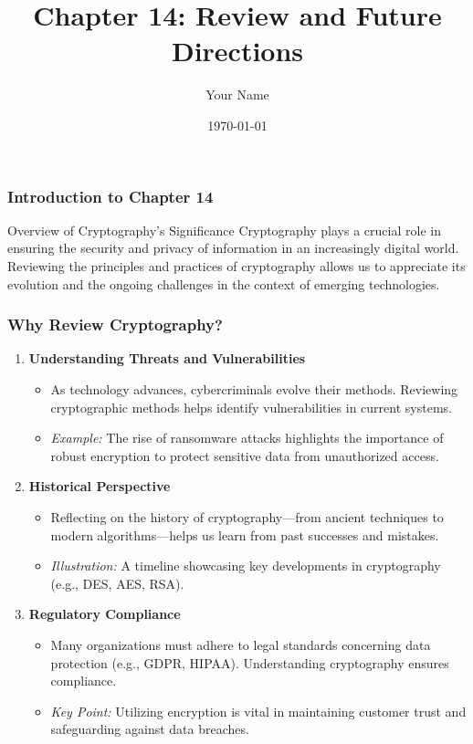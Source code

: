 \documentclass{beamer}
\title{Chapter 14: Review and Future Directions}
\author{Your Name}
\institute{Your Institution}
\date{\today}
\begin{document}
\frame{\titlepage}

\begin{frame}[fragile]
    \frametitle{Introduction to Chapter 14}
    \begin{block}{Overview of Cryptography's Significance}
        Cryptography plays a crucial role in ensuring the security and privacy of information in an increasingly digital world. 
        Reviewing the principles and practices of cryptography allows us to appreciate its evolution and the ongoing challenges in the context of emerging technologies.
    \end{block}
\end{frame}

\begin{frame}[fragile]
    \frametitle{Why Review Cryptography?}
    \begin{enumerate}
        \item \textbf{Understanding Threats and Vulnerabilities}
            \begin{itemize}
                \item As technology advances, cybercriminals evolve their methods. Reviewing cryptographic methods helps identify vulnerabilities in current systems.
                \item \textit{Example:} The rise of ransomware attacks highlights the importance of robust encryption to protect sensitive data from unauthorized access.
            \end{itemize}
        \item \textbf{Historical Perspective}
            \begin{itemize}
                \item Reflecting on the history of cryptography—from ancient techniques to modern algorithms—helps us learn from past successes and mistakes.
                \item \textit{Illustration:} A timeline showcasing key developments in cryptography (e.g., DES, AES, RSA).
            \end{itemize}
        \item \textbf{Regulatory Compliance}
            \begin{itemize}
                \item Many organizations must adhere to legal standards concerning data protection (e.g., GDPR, HIPAA). Understanding cryptography ensures compliance.
                \item \textit{Key Point:} Utilizing encryption is vital in maintaining customer trust and safeguarding against data breaches.
            \end{itemize}
    \end{enumerate}
\end{frame}
\end{document}
